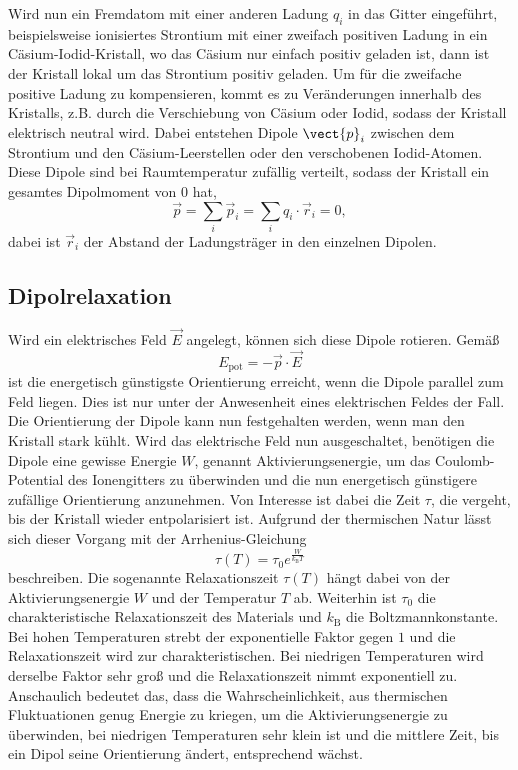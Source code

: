 Wird nun ein Fremdatom mit einer anderen Ladung $q_i$ in das Gitter eingeführt, beispielsweise ionisiertes Strontium mit einer zweifach positiven Ladung in ein Cäsium-Iodid-Kristall, wo das Cäsium nur einfach positiv geladen ist,
dann ist der Kristall lokal um das Strontium positiv geladen. Um für die zweifache positive Ladung zu kompensieren, kommt es zu Veränderungen innerhalb des Kristalls, z.B. durch die Verschiebung von Cäsium oder Iodid, sodass der Kristall
elektrisch neutral wird. Dabei entstehen Dipole $\vect{p}_i$ zwischen dem Strontium und den Cäsium-Leerstellen oder den verschobenen Iodid-Atomen. Diese Dipole sind bei Raumtemperatur zufällig verteilt, sodass der Kristall ein gesamtes Dipolmoment von 0 hat,
\begin{equation*}
    \vec{p} = \sum_i \vec{p}_i = \sum_i q_i \cdot \vec{r}_i = 0,
 \end{equation*}
 dabei ist $\vec{r}_i$ der Abstand der Ladungsträger in den einzelnen Dipolen.

 \subsection{Dipolrelaxation}

Wird ein elektrisches Feld $\vec{E}$ angelegt, können sich diese Dipole rotieren. Gemäß
\begin{equation*}
    E_\text{pot} = - \vec{p} \cdot \vec{E}
\end{equation*}
ist die energetisch günstigste Orientierung erreicht, wenn die Dipole parallel zum Feld liegen. Dies ist nur unter der Anwesenheit eines elektrischen Feldes der Fall.
Die Orientierung der Dipole kann nun festgehalten werden, wenn man den Kristall stark kühlt. Wird das elektrische Feld nun ausgeschaltet, benötigen die Dipole eine gewisse Energie $W$, genannt Aktivierungsenergie, um das Coulomb-Potential des Ionengitters zu überwinden
und die nun energetisch günstigere zufällige Orientierung anzunehmen. 
Von Interesse ist dabei die Zeit $\tau$, die vergeht, bis der Kristall wieder entpolarisiert ist. Aufgrund der thermischen Natur lässt sich dieser Vorgang mit der Arrhenius-Gleichung 
\begin{equation}
    \tau\left(T\right) = \tau_0 e^{\frac{W}{k_\text{B}T}}
    \label{eq:arrhenius}
\end{equation}
beschreiben. Die sogenannte Relaxationszeit $\tau\left(T\right)$ hängt dabei von der Aktivierungsenergie $W$ und der Temperatur $T$ ab. Weiterhin ist $\tau_0$ die charakteristische Relaxationszeit des Materials und $k_\text{B}$
die Boltzmannkonstante. Bei hohen Temperaturen strebt der exponentielle Faktor gegen $1$ und die Relaxationszeit wird zur charakteristischen. Bei niedrigen Temperaturen wird derselbe Faktor sehr groß und die Relaxationszeit nimmt exponentiell zu.
Anschaulich bedeutet das, dass die Wahrscheinlichkeit, aus thermischen Fluktuationen genug Energie zu kriegen, um die Aktivierungsenergie zu überwinden, bei niedrigen Temperaturen sehr klein ist und die mittlere Zeit, bis ein Dipol seine Orientierung ändert, entsprechend wächst.

